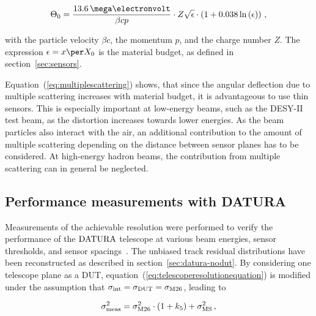 \begin{equation}
\label{eq:multiplescattering}
\Theta_{0} = \frac{13.6\,\mega\electronvolt}{\beta c p} \cdot Z
\sqrt{\epsilon}
\cdot \left( 1 + 0.038 \ln{\left( \epsilon \right) } \right) \,,
\end{equation}

\noindent with the particle velocity $\beta c$, the momentum $p$, and the charge number $Z$. 
The expression $\epsilon = x \per X_0$ is the material budget, as defined in section~\ref{sec:sensors}.

Equation~(\ref{eq:multiplescattering}) shows, that since the angular deflection due to multiple scattering increases with material budget, it is advantageous to use thin sensors.
This is especially important at low-energy beams, such as the DESY-II test beam, as the distortion increases towards lower energies.
As the beam particles also interact with the air, an additional contribution to the amount of multiple scattering depending on the distance between sensor planes has to be considered. 
At high-energy hadron beams, the contribution from multiple scattering can in general be neglected.

\subsection{Performance measurements with DATURA}
\label{sec:measurements}

Measurements of the achievable resolution were performed to verify the performance of the $\textrm{DATURA}$ telescope at various beam energies, sensor thresholds, and sensor spacings~\cite{ref:thomas}.
The unbiased track residual distributions have been reconstructed as described in section~\ref{sec:datura-nodut}.
By considering one telescope plane as a DUT, equation~(\ref{eq:telescoperesolutionequation}) is modified under the assumption that $\sigma_{\textrm{int}} = \sigma_{\textrm{DUT}} = \sigma_{\textrm{M26}}$,
 leading to

\begin{equation}
\label{eq:telescoperesolutionequation_2}
\sigma_{\textrm{meas}}^2 = \sigma_{\textrm{M26}}^2 \cdot \left( 1 + k_5 \right) +
\sigma_{\textrm{MS}}^2\,,
\end{equation}

